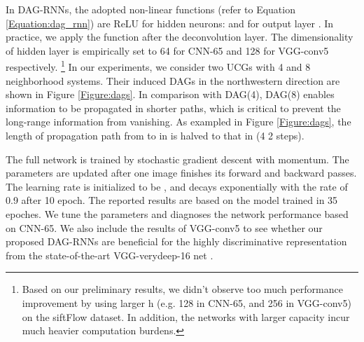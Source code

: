 \documentclass[10pt,twocolumn,letterpaper]{article}
\begin{document}
In DAG-RNNs, the adopted non-linear functions (refer to Equation \ref{Equation:dag_rnn}) are ReLU \cite{krizhevsky2012imagenet} for hidden neurons:  and  for output layer . In practice, we apply the function  after the deconvolution layer. The dimensionality of hidden layer   is empirically set to 64 for CNN-65 and 128 for VGG-conv5 respectively.
\footnote{Based on our preliminary results, we didn't observe too much performance improvement by using larger h (e.g. 128 in CNN-65, and 256 in VGG-conv5) on the siftFlow dataset. In addition, the networks with larger capacity incur much heavier computation burdens.}
In our experiments, we consider two UCGs with 4 and 8 neighborhood systems. Their induced DAGs in the northwestern direction are shown in Figure \ref{Figure:dags}. In comparison with DAG(4), DAG(8) enables information to be propagated in shorter paths, which is critical to prevent the long-range information from vanishing. As exampled in Figure \ref{Figure:dags}, the length of propagation path from  to  in  is halved to that in  (4  2 steps).



The full network is trained by stochastic gradient descent with momentum. The parameters are updated after one image finishes its forward and backward passes. The learning rate is initialized to be , and decays exponentially with the rate of 0.9 after 10 epoch. The reported results are based on the model trained in 35 epoches.
We tune the parameters and diagnoses the network performance based on CNN-65. We also include the results of VGG-conv5 to see whether our proposed DAG-RNNs are beneficial for the highly discriminative representation from the state-of-the-art VGG-verydeep-16 net \cite{simonyan2014very}.
\end{document}

